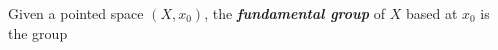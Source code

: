 \documentclass[preview]{standalone}
\begin{document}
\begin{center}
Given a pointed space $(X,x_0)$, the \textbf{\textit{fundamental group}} of $X$ based at $x_0$ is the group
\end{center}
\end{document}
